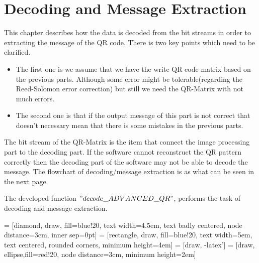 \chapter{Decoding and Message Extraction}

This chapter describes how the data is decoded from the bit streams in order to extracting the message of the QR code. There is two key points which need to be clarified.
\begin{itemize}
\item The first one is we assume that we have the write QR code matrix based on the previous parts. Although some error might be tolerable(regarding the Reed-Solomon error correction) but still we need the QR-Matrix with not much errors.
\item The second one is that if the output message of this part is not correct that doesn't necessary mean that there is some mistakes in the previous parts.
\end{itemize}

The bit stream of the QR-Matrix is the item that connect the image processing part to the decoding part. If the software cannot reconstruct the QR pattern correctly then the decoding part of the software may not be able to decode the message. The flowchart of decoding/message extraction is as what can be seen in the next page.

The developed function $"decode\_ADVANCED\_QR"$, performs the task of decoding and message extraction.



 = [diamond, draw, fill=blue!20, 
    text width=4.5em, text badly centered, node distance=3cm, inner sep=0pt]
 = [rectangle, draw, fill=blue!20, 
    text width=5em, text centered, rounded corners, minimum height=4em]
 = [draw, -latex']
 = [draw, ellipse,fill=red!20, node distance=3cm,
    minimum height=2em]
    
